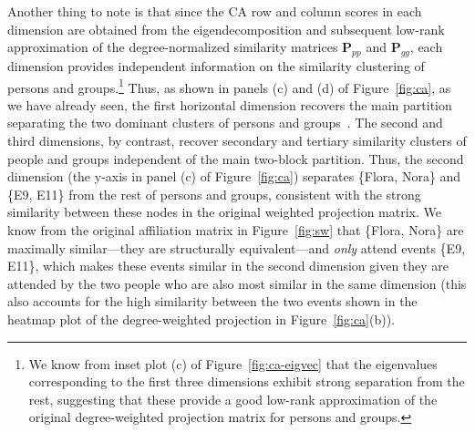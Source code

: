 \documentclass[a4paper,fleqn]{cas-sc}
\begin{document}
Another thing to note is that since the CA row and column scores in each dimension are obtained from the eigendecomposition and subsequent low-rank approximation of the degree-normalized similarity matrices $\mathbf{P}_{pp}$ and $\mathbf{P}_{gg}$, each dimension provides independent information on the similarity clustering of persons and groups.\footnote{We know from inset plot (c) of Figure~\ref{fig:ca-eigvec} that the eigenvalues corresponding to the first three dimensions exhibit strong separation from the rest, suggesting that these provide a good low-rank approximation of the original degree-weighted projection matrix for persons and groups.}  Thus, as shown in panels (c) and (d) of Figure~\ref{fig:ca}, as we have already seen, the first horizontal dimension recovers the main partition separating the two dominant clusters of persons and groups~\citep{freeman2003finding}. The second and third dimensions, by contrast, recover secondary and tertiary similarity clusters of people and groups independent of the main two-block partition. Thus, the second dimension (the y-axis in panel (c) of Figure~\ref{fig:ca}) separates \{Flora, Nora\} and \{E9, E11\} from the rest of persons and groups, consistent with the strong similarity between these nodes in the original weighted projection matrix. We know from the original affiliation matrix in Figure~\ref{fig:sw} that \{Flora, Nora\} are maximally similar---they are structurally equivalent---and \textit{only} attend events \{E9, E11\}, which makes these events similar in the second dimension given they are attended by the two people who are also most similar in the same dimension (this also accounts for the high similarity between the two events shown in the heatmap plot of the degree-weighted projection in Figure~\ref{fig:ca}(b)). 
\end{document}

